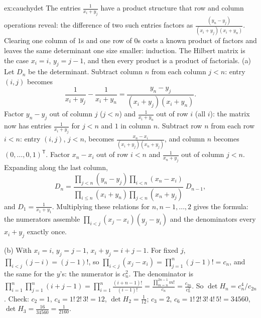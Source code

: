 \begin{solution}{ex:cauchydet}
\idea The entries $\frac1{x_i+y_j}$ have a product structure that row and column operations reveal: the difference of two such entries factors as $\frac{(y_n-y_j)}{(x_i+y_j)(x_i+y_n)}$. Clearing one column of $1$s and one row of $0$s costs a known product of factors and leaves the same determinant one size smaller: induction. The Hilbert matrix is the case $x_i=i$, $y_j=j-1$, and then every product is a product of factorials.
\writeup (a) Let $D_n$ be the determinant. Subtract column $n$ from each column $j<n$: entry $(i,j)$ becomes
\[
\frac1{x_i+y_j}-\frac1{x_i+y_n}=\frac{y_n-y_j}{(x_i+y_j)(x_i+y_n)}.
\]
Factor $y_n-y_j$ out of column $j$ ($j<n$) and $\frac1{x_i+y_n}$ out of row $i$ (all $i$): the matrix now has entries $\frac1{x_i+y_j}$ for $j<n$ and $1$ in column $n$. Subtract row $n$ from each row $i<n$: entry $(i,j)$, $j<n$, becomes $\frac{x_n-x_i}{(x_i+y_j)(x_n+y_j)}$, and column $n$ becomes $(0,\dots,0,1)^{\mathsf T}$. Factor $x_n-x_i$ out of row $i<n$ and $\frac1{x_n+y_j}$ out of column $j<n$. Expanding along the last column,
\[
D_n=\frac{\prod_{j<n}(y_n-y_j)\prod_{i<n}(x_n-x_i)}{\prod_{i\le n}(x_i+y_n)\prod_{j<n}(x_n+y_j)}\;D_{n-1},
\]
and $D_1=\frac1{x_1+y_1}$. Multiplying these relations for $n,n-1,\dots,2$ gives the formula: the numerators assemble $\prod_{i<j}(x_j-x_i)(y_j-y_i)$ and the denominators every $x_i+y_j$ exactly once.

(b) With $x_i=i$, $y_j=j-1$, $x_i+y_j=i+j-1$. For fixed $j$, $\prod_{i<j}(j-i)=(j-1)!$, so $\prod_{i<j}(x_j-x_i)=\prod_{j=1}^n(j-1)!=c_n$, and the same for the $y$'s: the numerator is $c_n^2$. The denominator is $\prod_{i=1}^n\prod_{j=1}^n(i+j-1)=\prod_{i=1}^n\frac{(i+n-1)!}{(i-1)!}=\frac{\prod_{m=n}^{2n-1}m!}{c_n}=\frac{c_{2n}}{c_n^2}$. So $\det H_n=c_n^4/c_{2n}$. Check: $c_2=1$, $c_4=1!\,2!\,3!=12$, $\det H_2=\frac1{12}$; $c_3=2$, $c_6=1!\,2!\,3!\,4!\,5!=34560$, $\det H_3=\frac{16}{34560}=\frac1{2160}$.


\end{solution}
